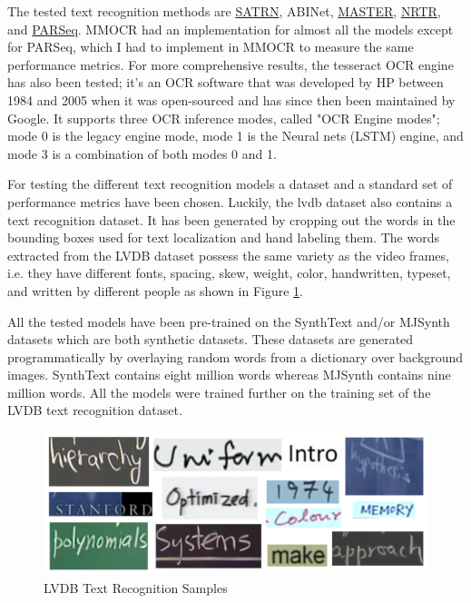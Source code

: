 The tested text recognition methods are \hyperref[satrn]{SATRN}, ABINet, \hyperref[master]{MASTER}, \hyperref[nrtr]{NRTR}, and \hyperref[parseq]{PARSeq}.
MMOCR had an implementation for almost all the models except for PARSeq, which I had to implement in MMOCR to measure the same performance metrics.
For more comprehensive results, the tesseract OCR engine has also been tested; it's an OCR software that was developed by HP between 1984 and 2005 when it was open-sourced and has since then been maintained by Google. It supports three OCR inference modes, called "OCR Engine modes"; mode 0 is the legacy engine mode, mode 1 is the Neural nets (LSTM) engine, and mode 3 is a combination of both modes 0 and 1.

For testing the different text recognition models a dataset and a standard set of performance metrics have been chosen. Luckily, the \gls{lvdb} dataset also contains a text recognition dataset. It has been generated by cropping out the words in the bounding boxes used for text localization and hand labeling them. The words extracted from the LVDB dataset possess the same variety as the video frames, i.e. they have different fonts, spacing, skew, weight, color, handwritten, typeset, and written by different people as shown in Figure \ref{meth:lvdb_textred_collage}.

All the tested models have been pre-trained on the SynthText \cite{gupta_synthetic_2016} and/or MJSynth \cite{jaderberg_synthetic_2014} datasets which are both synthetic datasets. These datasets are generated programmatically by overlaying random words from a dictionary over background images. SynthText contains eight million words whereas MJSynth contains nine million words. All the models were trained further on the training set of the LVDB text recognition dataset.

\begin{figure}[H]
        \centering
        \includegraphics[width=140mm]{figures/lvdb_textrec_collage.png}
        \caption{LVDB Text Recognition Samples}
        \label{meth:lvdb_textred_collage}
\end{figure}


